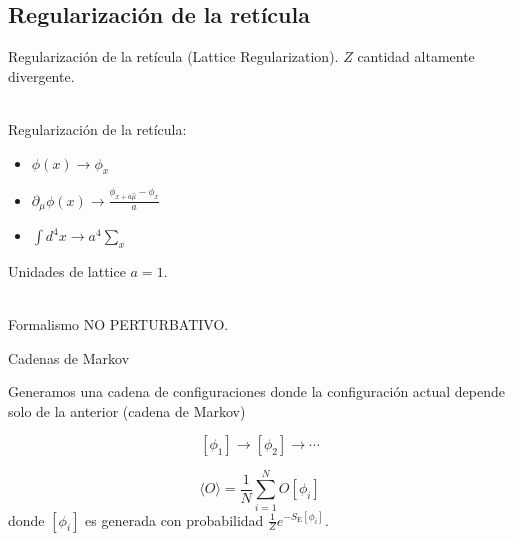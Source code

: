 \documentclass[11pt]{beamer}
\begin{document}
\subsection{Regularización de la retícula}
\begin{frame}{Regularización de la retícula (Lattice Regularization).}
    $Z$ cantidad altamente divergente.\\~
    
    Regularización de la retícula: %
    
    \begin{center}
    \end{center}
    \begin{itemize}
    		\item $\phi(x) \to \phi_x$
         \item $\displaystyle\partial_\mu\phi(x) \to \frac{\phi_{x + a\hat{\mu}} - \phi_x}{a}$
         \item $\displaystyle\int d^4x \to a^4\sum_{x}$
    \end{itemize}
    
    Unidades de lattice $a = 1$. \\~
    
    Formalismo NO PERTURBATIVO.
\end{frame}

\begin{frame}{Cadenas de Markov}

    Generamos una cadena de configuraciones donde la configuración actual depende solo de la anterior (cadena de Markov)
    
    $$ [\phi_1] \to [\phi_2] \to \cdots$$

    $$\langle O \rangle = \frac{1}{N}\sum_{i=1}^N O[\phi_i]$$
    donde $[\phi_i]$ es generada con probabilidad $\frac{1}{Z}e^{-S_{\text{E}}[\phi_i]}$.
\end{frame}
\end{document}
